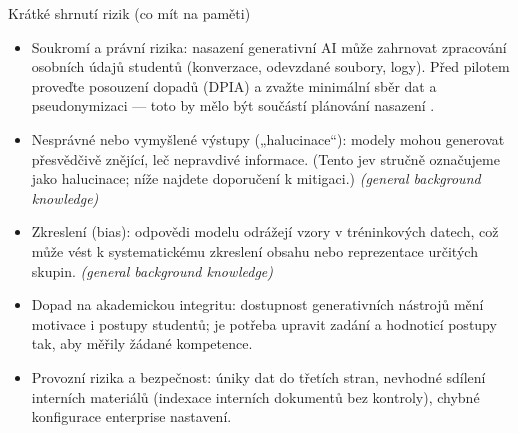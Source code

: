 Krátké shrnutí rizik (co mít na paměti)
\begin{itemize}
  \item Soukromí a právní rizika: nasazení generativní AI může zahrnovat zpracování osobních údajů studentů (konverzace, odevzdané soubory, logy). Před pilotem proveďte posouzení dopadů (DPIA) a zvažte minimální sběr dat a pseudonymizaci — toto by mělo být součástí plánování nasazení \cite{kb_malinka_chatgpt_ve_vyuce_dva_roky_pote_2024_pdf_90bc3aaf_page_12_1}. 
  \item Nesprávné nebo vymyšlené výstupy („halucinace“): modely mohou generovat přesvědčivě znějící, leč nepravdivé informace. (Tento jev stručně označujeme jako halucinace; níže najdete doporučení k mitigaci.) \emph{(general background knowledge)}
  \item Zkreslení (bias): odpovědi modelu odrážejí vzory v tréninkových datech, což může vést k systematickému zkreslení obsahu nebo reprezentace určitých skupin. \emph{(general background knowledge)}
  \item Dopad na akademickou integritu: dostupnost generativních nástrojů mění motivace i postupy studentů; je potřeba upravit zadání a hodnoticí postupy tak, aby měřily žádané kompetence.
  \item Provozní rizika a bezpečnost: úniky dat do třetích stran, nevhodné sdílení interních materiálů (indexace interních dokumentů bez kontroly), chybné konfigurace enterprise nastavení.
\end{itemize}

